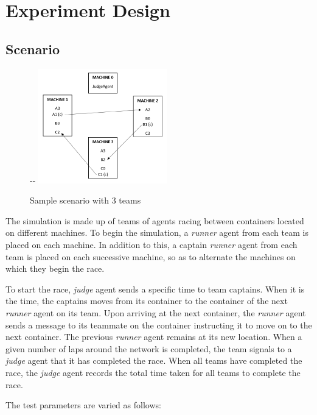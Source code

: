 \documentclass[11pt,titlepage]{article}
\newlength{\offsetpage}
\newenvironment{widepage}{
	\begin{adjustwidth}{-\offsetpage}{-\offsetpage}%
    \addtolength{\textwidth}{2\offsetpage}}%
	{\end{adjustwidth}
}
\begin{document}
\section{Experiment Design}

\subsection{Scenario}

\begin{figure}[H]
	\begin{widepage}
		\centering
		\includegraphics[width=0.5\textwidth]{scenario.png}
	\end{widepage}
	\caption{Sample scenario with 3 teams}
	\label{fig:Sample-scenario}
\end{figure}

The simulation is made up of teams of agents racing between containers located on different machines. To begin the simulation, a \emph{runner} agent from each team is placed on each machine. In addition to this, a captain \emph{runner} agent from each team is placed on each successive machine, so as to alternate the machines on which they begin the race.

To start the race, \emph{judge} agent sends a specific time to team captains. When it is the time, the captains moves from its container to the container of the next \emph{runner} agent on its team. Upon arriving at the next container, the \emph{runner} agent sends a message to its teammate on the container instructing it to move on to the next container. The previous \emph{runner} agent remains at its new location. When a given number of laps around the network is completed, the team signals to a \emph{judge} agent that it has completed the race. When all teams have completed the race, the \emph{judge} agent records the total time taken for all teams to complete the race.

The test parameters are varied as follows:
\end{document}
